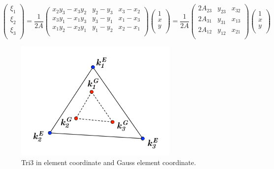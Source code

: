 \begin{equation}
\begin{pmatrix}
\xi_1 \\
\xi_2 \\
\xi_3 \\
\end{pmatrix}
= 
\frac{1}{2A}\begin{pmatrix}
x_2y_3-x_3y_2&y_2-y_3&x_3-x_2 \\
x_3y_1-x_1y_3&y_3-y_1&x_1-x_3 \\
x_1y_2-x_2y_1&y_1-y_2&x_2-x_1 \\
\end{pmatrix}
\begin{pmatrix}
1\\
x \\
y \\
\end{pmatrix}
= 
\frac{1}{2A}\begin{pmatrix}
2A_{23}&y_{23}&x_{32} \\
2A_{31}&y_{31}&x_{13} \\
2A_{12}&y_{12}&x_{21} \\
\end{pmatrix}
\begin{pmatrix}
1 \\
x \\
y \\

\end{pmatrix}
\end{equation}


\begin{figure}[h]
	\begin{center}
		\includegraphics[width=8cm,clip]{Tri3_1.pdf}			
		\caption{Tri3 in element coordinate and Gauss element coordinate.} \label{fig: Tri3_1}
	\end{center} 
\end{figure}


